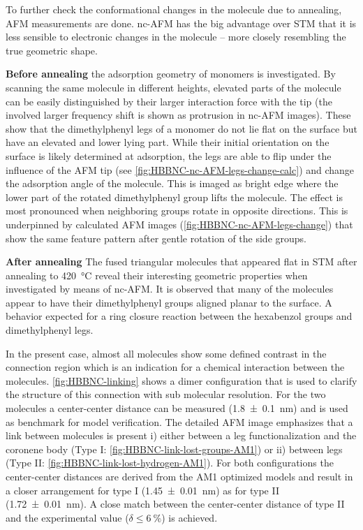 To further check the conformational changes in the molecule due to annealing, AFM measurements are done. nc-AFM has the big advantage over STM that it is less sensible to electronic changes in the molecule – more closely resembling the true geometric shape.

\textbf{Before annealing} the adsorption geometry of monomers is investigated. By scanning the same molecule in different heights, elevated parts of the molecule can be easily distinguished by their larger interaction force with the tip (the involved larger frequency shift is shown as protrusion in nc-AFM images). These show that the dimethylphenyl legs of a monomer do not lie flat on the surface but have an elevated and lower lying part. While their initial orientation on the surface is likely determined at adsorption, the legs are able to flip under the influence of the AFM tip (see \autoref{fig:HBBNC-nc-AFM-legs-change-calc}) and change the adsorption angle of the molecule. This is imaged as bright edge where the lower part of the rotated dimethylphenyl group lifts the molecule. The effect is most pronounced when neighboring groups rotate in opposite directions. This is underpinned by calculated AFM images (\autoref{fig:HBBNC-nc-AFM-legs-change}) that show the same feature pattern after gentle rotation of the side groups. 

\textbf{After annealing}
The fused triangular molecules that appeared flat in STM after annealing to \SI{420}{\celsius} reveal their interesting geometric properties when investigated by means of nc-AFM. It is observed that many of the molecules appear to have their dimethylphenyl groups aligned planar to the surface. A behavior expected for a ring closure reaction between the hexabenzol groups and dimethylphenyl legs.

In the present case, almost all molecules show some defined contrast in the connection region which is an indication for a chemical interaction between the molecules.
\autoref{fig:HBBNC-linking} shows a dimer configuration that is used to clarify the structure of this connection with sub molecular resolution. For the two molecules a center-center distance can be measured (\SI{1.8 \pm 0.1}{\nano \meter}) and is used as benchmark for model verification. The detailed AFM image emphasizes that a link between molecules is present i) either between a leg functionalization and the coronene body (Type I: \autoref{fig:HBBNC-link-lost-groups-AM1}) or ii) between legs (Type II: \autoref{fig:HBBNC-link-lost-hydrogen-AM1}). For both configurations the center-center distances are derived from the AM1 optimized models and result in a closer arrangement for type I (\SI{1.45 \pm 0.01}{\nano \meter}) as for type II (\SI{1.72 \pm 0.01}{\nano \meter}). A close match between the center-center distance of type II and the experimental value ($\delta \leq \SI{6}{\percent}$) is achieved.

